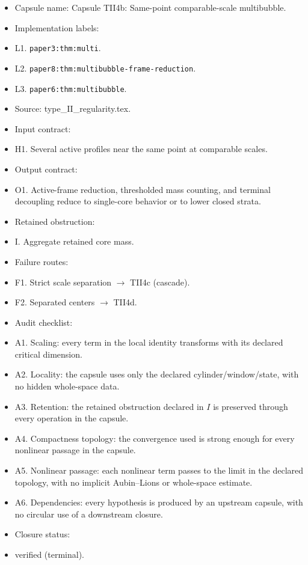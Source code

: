 \documentclass[11pt]{amsart}
\begin{document}
\begin{itemize}
  \item Capsule name: Capsule TII4b: Same-point comparable-scale multibubble.
  \item Implementation labels:
  \item L1. \texttt{paper3:thm:multi}.
  \item L2. \texttt{paper8:thm:multibubble-frame-reduction}.
  \item L3. \texttt{paper6:thm:multibubble}.
  \item Source: type\_II\_regularity.tex.
  \item Input contract:
  \item H1. Several active profiles near the same point at comparable scales.
  \item Output contract:
  \item O1. Active-frame reduction, thresholded mass counting, and terminal decoupling reduce to single-core behavior or to lower closed strata.
  \item Retained obstruction:
  \item I. Aggregate retained core mass.
  \item Failure routes:
  \item F1. Strict scale separation $\to$ TII4c (cascade).
  \item F2. Separated centers $\to$ TII4d.
  \item Audit checklist:
  \item A1. Scaling: every term in the local identity transforms with its declared critical dimension.
  \item A2. Locality: the capsule uses only the declared cylinder/window/state, with no hidden whole-space data.
  \item A3. Retention: the retained obstruction declared in $I$ is preserved through every operation in the capsule.
  \item A4. Compactness topology: the convergence used is strong enough for every nonlinear passage in the capsule.
  \item A5. Nonlinear passage: each nonlinear term passes to the limit in the declared topology, with no implicit Aubin--Lions or whole-space estimate.
  \item A6. Dependencies: every hypothesis is produced by an upstream capsule, with no circular use of a downstream closure.
  \item Closure status:
  \item verified (terminal).
\end{itemize}
\end{document}
